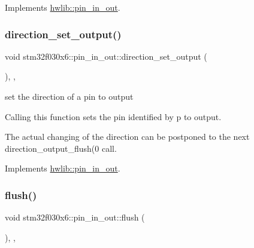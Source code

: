 Implements \hyperlink{classhwlib_1_1pin__in__out_a54ce1a5086d3c9e7b868511b1d46acd0}{hwlib\+::pin\+\_\+in\+\_\+out}.

\mbox{\label{classstm32f030x6_1_1pin__in__out_a67a4cc5a76ccf6070d6aad1b5c7bfc01}} 
\subsubsection{\texorpdfstring{direction\+\_\+set\+\_\+output()}{direction\_set\_output()}}
{\footnotesize\ttfamily void stm32f030x6\+::pin\+\_\+in\+\_\+out\+::direction\+\_\+set\+\_\+output (\begin{DoxyParamCaption}{ }\end{DoxyParamCaption})\hspace{0.3cm}{\ttfamily [inline]}, {\ttfamily [override]}, {\ttfamily [virtual]}}

set the direction of a pin to output

Calling this function sets the pin identified by p to output.

The actual changing of the direction can be postponed to the next direction\+\_\+output\+\_\+flush(0 call. 

Implements \hyperlink{classhwlib_1_1pin__in__out_ad08a5f5e9a4c3aadaa7c665b98f2418e}{hwlib\+::pin\+\_\+in\+\_\+out}.

\mbox{\label{classstm32f030x6_1_1pin__in__out_a89e04e9a27e2eab76739b4c9195abd34}} 
\subsubsection{\texorpdfstring{flush()}{flush()}}
{\footnotesize\ttfamily void stm32f030x6\+::pin\+\_\+in\+\_\+out\+::flush (\begin{DoxyParamCaption}{ }\end{DoxyParamCaption})\hspace{0.3cm}{\ttfamily [inline]}, {\ttfamily [override]}, {\ttfamily [virtual]}}

